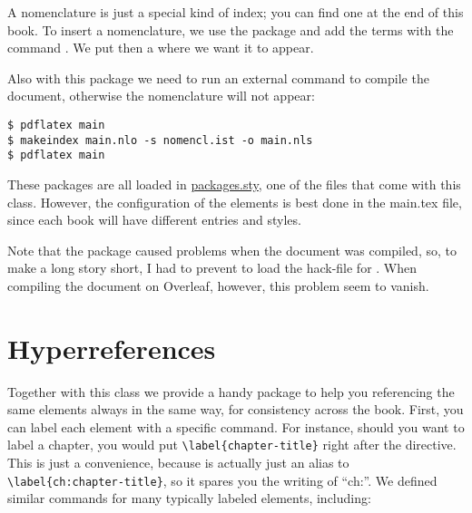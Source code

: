 A nomenclature is just a special kind of index; you can find one at the end of
this book. To insert a nomenclature, we use the package  and
add the terms with the command . We put then a
 where we want it to appear.

Also with this package we need to run an external command to compile the 
document, otherwise the nomenclature will not appear:

\begin{lstlisting}[style=kaolstplain]
$ pdflatex main
$ makeindex main.nlo -s nomencl.ist -o main.nls
$ pdflatex main
\end{lstlisting}

These packages are all loaded in 
\href{style/packages.sty}{packages.sty}, one of the files that come with 
this class. However, the configuration of the elements is best done in 
the main.tex file, since each book will have different entries and 
styles.

Note that the  package caused problems when the 
document was compiled, so, to make a long story short, I had to prevent 
 to load the hack-file for . When 
compiling the document on Overleaf, however, this problem seem to 
vanish.


\section{Hyperreferences}
\label{hyprefs}

Together with this class we provide a handy package to help you 
referencing the same elements always in the same way, for consistency 
across the book. First, you can label each element with a specific 
command. For instance, should you want to label a chapter, you would put 
\lstinline|\label{chapter-title}| right after the  
directive. This is just a convenience, because  is
actually just an alias to \lstinline|\label{ch:chapter-title}|, so it 
spares you the writing of \enquote{ch:}. We defined similar commands for 
many typically labeled elements, including:

